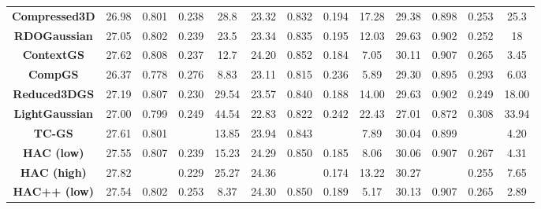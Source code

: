 \begin{table}[]
{\begin{tabular}{c|cccc|cccc|cccc}
\textbf{Compressed3D} \cite{niedermayr2024compressed}                                                                & 26.98    & 0.801    & 0.238    & 28.8     & 23.32      & 0.832      & 0.194     & 17.28     & 29.38     & 0.898    & 0.253    & 25.3     \\
\textbf{RDOGaussian} \cite{wang2024end}                                                                 & 27.05    & 0.802    & 0.239    & 23.5     & 23.34      & 0.835      & 0.195     & 12.03     & 29.63     & 0.902    & 0.252    & 18       \\
\textbf{ContextGS} \cite{wang2024contextgs}                                                                   & 27.62    & 0.808    & 0.237    & 12.7     & 24.20       & 0.852      & 0.184     & 7.05      & 30.11     & 0.907    & 0.265    & 3.45     \\ 
\textbf{CompGS} \cite{liu2024compgs} & 26.37    & 0.778    & 0.276    & 8.83     & 23.11       & 0.815      & 0.236     & 5.89      & 29.30     & 0.895    & 0.293    & 6.03  \\
\textbf{Reduced3DGS} \cite{papantonakis2024reducing} & 27.19    & 0.807    & 0.230    & 29.54 & 23.57       & 0.840      & 0.188     & 14.00      & 29.63     & 0.902    & 0.249    & 18.00  \\
\textbf{LightGaussian} \cite{fan2024lightgaussian} & 27.00    & 0.799    & 0.249    & 44.54 & 22.83       & 0.822      & 0.242     & 22.43      & 27.01     & 0.872    & 0.308    & 33.94  \\
\hline
\textbf{TC-GS} \cite{wang2025tc} & 27.61    & 0.801    & \cellcolor[HTML]{FFC7CE}{0.166}    & 13.85    & 23.94      & 0.843      & \cellcolor[HTML]{FFC7CE}{0.113}     & 7.89      & 30.04     & 0.899    & \cellcolor[HTML]{FFEB9C}{0.122}    & 4.20     \\
\textbf{HAC (low)} \cite{chen2024hac}                                                                   & 27.55    & 0.807    & 0.239    & 15.23    & 24.29      & 0.850      & 0.185     & 8.06      & 30.06     & 0.907    & 0.267    & 4.31     \\
\textbf{HAC (high)} \cite{chen2024hac}                                                                  & 27.82    & \cellcolor[HTML]{FFEB9C}{0.811}    & 0.229    & 25.27    & 24.36      & \cellcolor[HTML]{FFC7CE}{0.857}      & 0.174     & 13.22     & 30.27     & \cellcolor[HTML]{FFEB9C}{0.910}    & 0.255    & 7.65     \\
\textbf{HAC++ (low)} \cite{chen2025hac++}                                                                 & 27.54    & 0.802    & 0.253    & 8.37     & 24.30       & 0.850       & 0.189     & 5.17      & 30.13     & 0.907    & 0.265    & 2.89     \\

\end{tabular}}
\end{table}
